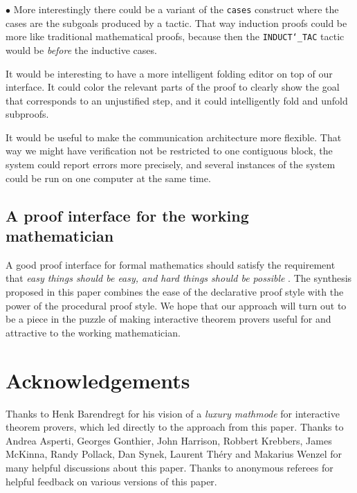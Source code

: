 \documentclass{LMCS}
\begin{document}
\begin{iteMize}{$\bullet$}
More interestingly there could be a variant of the \texttt{cases}
construct where the cases are the subgoals produced by a tactic.
That way induction proofs could be more like traditional mathematical proofs,
because then
the \texttt{INDUCT\char`\_TAC} tactic would be \emph{before} the
inductive cases.

\item
It would be interesting to have a more intelligent folding editor on top
of our interface.
It could color the relevant parts of the proof to
clearly show the goal that corresponds to an unjustified step,
and it could intelligently fold and unfold subproofs.

\item
It would be useful to make the communication architecture more flexible.
That way we might have verification not be restricted to one contiguous block,
the system could report errors more precisely,
and several instances of
the system could be run on one computer at the same time.

\end{iteMize}


\subsection{A proof interface for the working mathematician}

\noindent
A good proof interface for formal mathematics should satisfy the
requirement that
\emph{easy things should be easy, and hard things should be possible} \cite{bea:98}.
The synthesis proposed in this paper combines the ease of the declarative
proof style with the power of the procedural proof style.
We hope that our approach will turn out to be a piece in the puzzle
of making interactive theorem provers useful for and attractive to the
working mathematician.


\section*{Acknowledgements}

\noindent
Thanks to Henk Barendregt for his vision of a \emph{luxury mathmode} for interactive
theorem provers, which led directly to the approach from this paper.
Thanks to
Andrea Asperti,
Georges Gonthier,
John Harrison,
Robbert Krebbers,
James McKinna,
Randy Pollack,
Dan Synek,
Laurent Th\'ery and
Makarius Wenzel
for many helpful discussions about this paper.
Thanks to anonymous referees for helpful feedback on various versions of this paper.
\end{document}

